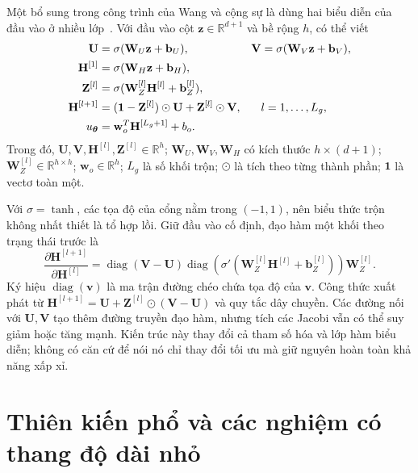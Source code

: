 Một bổ sung trong công trình của Wang và cộng sự là dùng hai biểu
diễn của đầu vào ở nhiều lớp~\cite{wang2020}. Với đầu vào cột
$\mathbf{z}\in\mathbb{R}^{d+1}$ và bề rộng $h$, có thể viết
\begin{align}
 \mathbf{U}&=\sigma(\mathbf{W}_U\mathbf{z}+\mathbf{b}_U),&
 \mathbf{V}&=\sigma(\mathbf{W}_V\mathbf{z}+\mathbf{b}_V),\notag\\
 \mathbf{H}^{[1]}&=\sigma(\mathbf{W}_H\mathbf{z}+\mathbf{b}_H),\notag\\
 \mathbf{Z}^{[l]}&=\sigma(\mathbf{W}_Z^{[l]}\mathbf{H}^{[l]}
                                      +\mathbf{b}_Z^{[l]}),\notag\\
 \mathbf{H}^{[l+1]}&=(\mathbf{1}-\mathbf{Z}^{[l]})\odot\mathbf{U}
                             +\mathbf{Z}^{[l]}\odot\mathbf{V},
                      &&l=1,\ldots,L_g,\notag\\
 u_{\boldsymbol{\theta}}&=\mathbf{w}_{o}^{T}\mathbf{H}^{[L_g+1]}+b_o.
 \label{p4:eq:gated}
\end{align}
Trong đó, $\mathbf{U},\mathbf{V},\mathbf{H}^{[l]},\mathbf{Z}^{[l]}
\in\mathbb{R}^{h}$; $\mathbf{W}_U,\mathbf{W}_V,\mathbf{W}_H$
có kích thước $h\times(d+1)$;
$\mathbf{W}_Z^{[l]}\in\mathbb{R}^{h\times h}$;
$\mathbf{w}_o\in\mathbb{R}^{h}$; $L_g$ là số khối trộn;
$\odot$ là tích theo từng thành phần; $\mathbf{1}$ là vectơ toàn một.

Với $\sigma=\tanh$, các tọa độ của cổng nằm trong $(-1,1)$, nên
biểu thức trộn không nhất thiết là tổ hợp lồi. Giữ đầu vào cố định,
đạo hàm một khối theo trạng thái trước là
\begin{equation}
 \frac{\partial\mathbf{H}^{[l+1]}}{\partial\mathbf{H}^{[l]}}
 =\operatorname{diag}(\mathbf{V}-\mathbf{U})
  \operatorname{diag}\!\left(\sigma'(\mathbf{W}_Z^{[l]}
                     \mathbf{H}^{[l]}+\mathbf{b}_Z^{[l]})\right)
  \mathbf{W}_Z^{[l]}.
 \label{p4:eq:gated-jacobian}
\end{equation}
Ký hiệu $\operatorname{diag}(\mathbf{v})$ là ma trận đường chéo chứa
tọa độ của $\mathbf{v}$. Công thức xuất phát từ
$\mathbf{H}^{[l+1]}=\mathbf{U}+\mathbf{Z}^{[l]}\odot(\mathbf{V}-\mathbf{U})$
và quy tắc dây chuyền. Các đường nối với $\mathbf{U},\mathbf{V}$
tạo thêm đường truyền đạo hàm, nhưng tích các Jacobi vẫn có thể suy
giảm hoặc tăng mạnh. Kiến trúc này thay đổi cả tham số hóa và lớp
hàm biểu diễn; không có căn cứ để nói nó chỉ thay đổi tối ưu mà giữ
nguyên hoàn toàn khả năng xấp xỉ.

\section{Thiên kiến phổ và các nghiệm có thang độ dài nhỏ}
\label{sec:spectral-bias}

